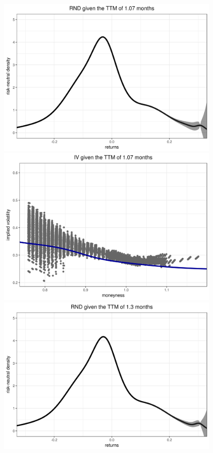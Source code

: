 \documentclass[a4paper,12pt]{article}
\theoremstyle{plain}
\theoremstyle{definition}
\begin{document}
\begin{figure}[H]
\begin{center}
 \includegraphics[width=\linewidth]{figures/hour_3th/GOOG_20150105_rnd_ci_3th_hour_ttm_1_07.png}
 \endminipage
 \hspace{3mm}
 \includegraphics[width=\linewidth]{figures/hour_3th/GOOG_20150105_iv_smile_3th_hour_ttm_1_07.png}
 \endminipage\\
 \includegraphics[width=\linewidth]{figures/hour_3th/GOOG_20150105_rnd_ci_3th_hour_ttm_1_3.png}

\end{center}
\end{figure}
\end{document}
